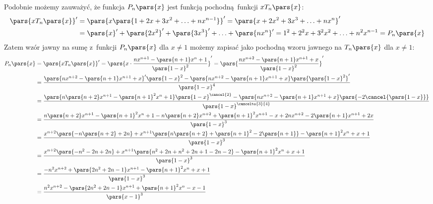 Podobnie możemy zauważyć, że funkcja \(P_n\pars{x}\) jest funkcją pochodną funkcji \(xT_n\pars{x}\):
\begin{equation*}
    \begin{split}
        \pars{xT_n\pars{x}}'
            &= \pars{x\pars{1 + 2x + 3x^2 + \ldots + nx^{n - 1}}}'
            = \pars{x + 2x^2 + 3x^3 + \ldots + nx^n}'\\
            &= \pars{x}' + \pars{2x^2}' + \pars{3x^3}' + \ldots + \pars{nx^n}'
            = 1^2 + 2^2x + 3^2x^2 + \ldots + n^2x^{n - 1}
            = P_n\pars{x}
    \end{split}
\end{equation*}
Zatem wzór jawny na sumę z~funkcji \(P_n\pars{x}\) dla \(x \neq 1\) możemy zapisać jako pochodną wzoru jawnego na \(T_n\pars{x}\) dla \(x \neq 1\):
\begin{equation*}
    \begin{split}
        P_n\pars{x}
            &= \pars{xT_n\pars{x}}'
            = \pars{x \cdot \frac{nx^{n + 1} - \pars{n + 1}x^n + 1}{\pars{1 - x}^2}}'
            = \pars{\frac{nx^{n + 2} - \pars{n + 1}x^{n + 1} + x}{\pars{1 - x}^2}}'\\
            &= \frac{\pars{nx^{n + 2} - \pars{n + 1}x^{n + 1} + x}'\pars{1 - x}^2 - \pars{nx^{n + 2} - \pars{n + 1}x^{n + 1} + x}\pars{\pars{1 - x}^2}'}{\pars{1 - x}^4}\\
            &= \frac{\pars{n\pars{n + 2}x^{n + 1} - \pars{n + 1}^2x^n + 1}\pars{1 - x}^{\cancel{2}} - \pars{nx^{n + 2} - \pars{n + 1}x^{n + 1} + x}\pars{-2\cancel{\pars{1 - x}}}}{\pars{1 - x}^{\cancelto{3}{4}}}\\
            &= \frac{n\pars{n + 2}x^{n + 1} - \pars{n + 1}^2x^n + 1 - n\pars{n + 2}x^{n + 2} + \pars{n + 1}^2x^{n + 1} - x + 2nx^{n + 2} - 2\pars{n + 1}x^{n + 1} + 2x}{\pars{1 - x}^3}\\
            &= \frac{x^{n + 2}\pars{-n\pars{n + 2} + 2n} + x^{n + 1}\pars{n\pars{n + 2} + \pars{n + 1}^2 - 2\pars{n + 1}} - \pars{n + 1}^2x^n + x + 1}{\pars{1 - x}^3}\\
            &= \frac{x^{n + 2}\pars{-n^2 - 2n + 2n} + x^{n + 1}\pars{n^2 + 2n + n^2 + 2n + 1 - 2n - 2} - \pars{n + 1}^2x^n + x + 1}{\pars{1 - x}^3}\\
            &= \frac{-n^2x^{n + 2} + \pars{2n^2 + 2n - 1}x^{n + 1} - \pars{n + 1}^2x^n + x + 1}{\pars{1 - x}^3}\\
            &= \frac{n^2x^{n + 2} - \pars{2n^2 + 2n - 1}x^{n + 1} + \pars{n + 1}^2x^n - x - 1}{\pars{x - 1}^3}
    \end{split}
\end{equation*}
